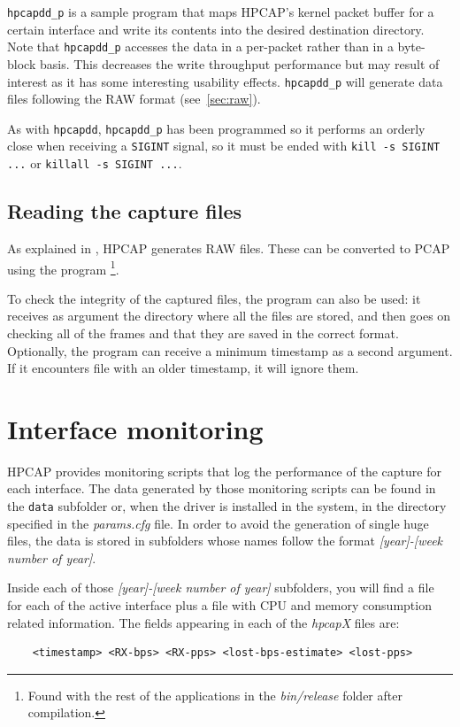 \documentclass[a4paper,oneside]{hpman}
\begin{document}
\texttt{hpcapdd\_p} is a sample program that maps HPCAP's kernel packet buffer for a certain interface and write its contents into the desired destination directory.
Note that \texttt{hpcapdd\_p} accesses the data in a per-packet rather than in a byte-block basis. This decreases the write throughput performance but may result of interest as it has some interesting usability effects.
\texttt{hpcapdd\_p} will generate data files following the RAW format (see~\ref{sec:raw}).

As with \texttt{hpcapdd}, \texttt{hpcapdd\_p} has been programmed so it performs an orderly close when receiving a \texttt{SIGINT} signal, so it must be ended with \texttt{kill -s SIGINT ...} or \texttt{killall -s SIGINT ...}.

\subsection{Reading the capture files}
\label{sec:CaptureFiles}

As explained in , HPCAP generates RAW files. These can be converted to PCAP using the program \footnote{Found with the rest of the applications in the \textit{bin/release} folder after compilation.}.

To check the integrity of the captured files, the program  can also be used: it receives as argument the directory where all the files are stored, and then goes on checking all of the frames and that they are saved in the correct format. Optionally, the program can receive a minimum timestamp as a second argument. If it encounters file with an older timestamp, it will ignore them.

\section{Interface monitoring}
\label{sec:Monitoring}

HPCAP provides monitoring scripts that log the performance of the capture for each interface. The data generated by those monitoring scripts can be found in the \texttt{data} subfolder or, when the driver is installed in the system, in the directory specified in the \textit{params.cfg} file. In order to avoid the generation of single huge files, the data is stored in subfolders whose names follow the format \textit{[year]-[week number of year]}.

Inside each of those \textit{[year]-[week number of year]} subfolders, you will find a file for each of the active interface plus a file with CPU and memory consumption related information. The fields appearing in each of the \textit{hpcapX} files are:
\begin{verbatim}
    <timestamp> <RX-bps> <RX-pps> <lost-bps-estimate> <lost-pps>
\end{verbatim}
\end{document}
